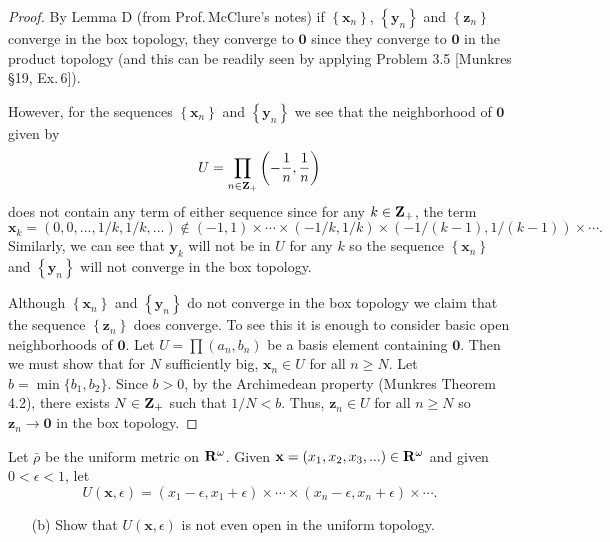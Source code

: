 \begin{proof}
By Lemma D (from Prof.\,McClure's notes) if
$\left\{\mathbf{x}_n\right\}$, $\left\{\mathbf{y}_n\right\}$ and
$\left\{\mathbf{z}_n\right\}$ converge in the box topology, they
converge to $\mathbf{0}$ since they converge to $\mathbf{0}$ in
the product topology (and this can be readily seen by applying
Problem 3.5 [Munkres \S19, Ex.\,6]).

However, for the sequences $\left\{\mathbf{x}_n\right\}$ and
$\left\{\mathbf{y}_n\right\}$ we see that the neighborhood of
$\mathbf{0}$ given by
\[
U=\prod_{n\in\mathbf{Z}_+}\left(-\frac{1}{n},\frac{1}{n}\right)
\]
does not contain any term of either sequence since for any
$k\in\mathbf{Z}_+$, the term
\[
\mathbf{x}_k
=\left(0,0,...,1/k,1/k,...\right)
\notin
(-1,1)
\times
\cdots
\times
\left(-1/k,1/k\right)
\times
\left(-1/(k-1),1/(k-1)\right)
\times\cdots.
\]
Similarly, we can see that $\mathbf{y}_k$ will not be in $U$ for
any $k$ so the sequence $\left\{\mathbf{x}_n\right\}$ and
$\left\{\mathbf{y}_n\right\}$ will not converge in the box
topology.

Although $\left\{\mathbf{x}_n\right\}$ and
$\left\{\mathbf{y}_n\right\}$ do not converge in the box topology
we claim that the sequence $\left\{\mathbf{z}_n\right\}$ does
converge. To see this it is enough to consider basic open
neighborhoods of $\mathbf{0}$. Let $U=\prod (a_n,b_n)$ be a basis
element containing $\mathbf{0}$. Then we must show that for $N$
sufficiently big, $\mathbf{x}_n\in U$ for all $n\geq N$. Let
$b=\min\{b_1,b_2\}$. Since $b>0$, by the Archimedean property
(Munkres Theorem 4.2), there exists $N\in\mathbf{Z}_+$ such that
$1/N<b$. Thus, $\mathbf{z}_n\in U$ for all $n\geq N$ so
$\mathbf{z}_n\to\mathbf{0}$ in the box topology.
\end{proof}
\newpage
\begin{problem}[Munkres \S20, Ex.\,6(b)]
Let $\bar\rho$ be the uniform metric on $\mathbf{R}^\omega$. Given
$\mathbf{x}=\left(x_1,x_2,x_3,...\right)\in\mathbf{R}^\omega$ and given
$0<\epsilon<1$, let
\[
U(\mathbf{x},\epsilon)=
\left(x_1-\epsilon,x_1+\epsilon\right)\times\cdots\times
\left(x_n-\epsilon,x_n+\epsilon\right)\times\cdots.
\]
\begin{enumerate}[noitemsep]
\item[(b)] Show that $U(\mathbf{x},\epsilon)$ is not even open in the
  uniform topology.
\end{enumerate}
\end{problem}
